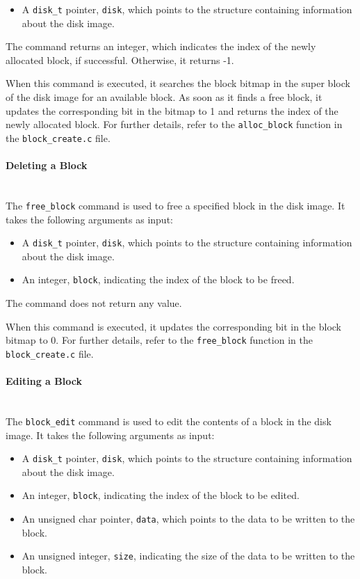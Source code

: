 \documentclass{article}
\begin{document}
\begin{itemize}
    \item A \texttt{disk\_t} pointer, \texttt{disk}, which points to the structure containing information about the disk image.
\end{itemize}

The command returns an integer, which indicates the index of the newly allocated block, if successful. Otherwise, it returns -1.

When this command is executed, it searches the block bitmap in the super block of the disk image for an available block. As soon as it finds a free block, it updates the corresponding bit in the bitmap to 1 and returns the index of the newly allocated block. For further details, refer to the \texttt{alloc\_block} function in the \texttt{block\_create.c} file.

\paragraph{Deleting a Block}\mbox{}\\
The \texttt{free\_block} command is used to free a specified block in the disk image. It takes the following arguments as input:

\begin{itemize}
    \item A \texttt{disk\_t} pointer, \texttt{disk}, which points to the structure containing information about the disk image.
    \item An integer, \texttt{block}, indicating the index of the block to be freed.
\end{itemize}

The command does not return any value.

When this command is executed, it updates the corresponding bit in the block bitmap to 0. For further details, refer to the \texttt{free\_block} function in the \texttt{block\_create.c} file.

\paragraph{Editing a Block}\mbox{}\\
The \texttt{block\_edit} command is used to edit the contents of a block in the disk image. It takes the following arguments as input:

\begin{itemize}
    \item A \texttt{disk\_t} pointer, \texttt{disk}, which points to the structure containing information about the disk image.
    \item An integer, \texttt{block}, indicating the index of the block to be edited.
    \item An unsigned char pointer, \texttt{data}, which points to the data to be written to the block.
    \item An unsigned integer, \texttt{size}, indicating the size of the data to be written to the block.
\end{itemize}
\end{document}
